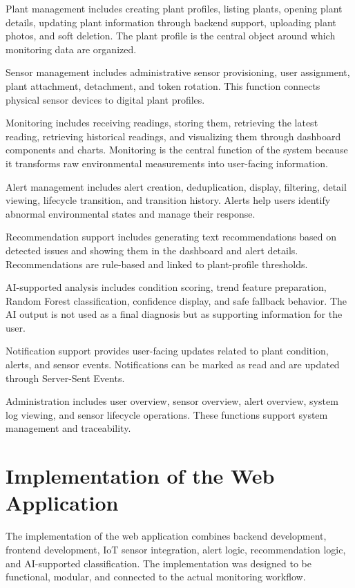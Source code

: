 Plant management includes creating plant profiles, listing plants, opening plant details, updating plant information through backend support, uploading plant photos, and soft deletion. The plant profile is the central object around which monitoring data are organized.

Sensor management includes administrative sensor provisioning, user assignment, plant attachment, detachment, and token rotation. This function connects physical sensor devices to digital plant profiles.

Monitoring includes receiving readings, storing them, retrieving the latest reading, retrieving historical readings, and visualizing them through dashboard components and charts. Monitoring is the central function of the system because it transforms raw environmental measurements into user-facing information.

Alert management includes alert creation, deduplication, display, filtering, detail viewing, lifecycle transition, and transition history. Alerts help users identify abnormal environmental states and manage their response.

Recommendation support includes generating text recommendations based on detected issues and showing them in the dashboard and alert details. Recommendations are rule-based and linked to plant-profile thresholds.

AI-supported analysis includes condition scoring, trend feature preparation, Random Forest classification, confidence display, and safe fallback behavior. The AI output is not used as a final diagnosis but as supporting information for the user.

Notification support provides user-facing updates related to plant condition, alerts, and sensor events. Notifications can be marked as read and are updated through Server-Sent Events.

Administration includes user overview, sensor overview, alert overview, system log viewing, and sensor lifecycle operations. These functions support system management and traceability.

\section{Implementation of the Web Application}
\label{sec:implementation-web-application}

The implementation of the web application combines backend development, frontend development, IoT sensor integration, alert logic, recommendation logic, and AI-supported classification. The implementation was designed to be functional, modular, and connected to the actual monitoring workflow.

